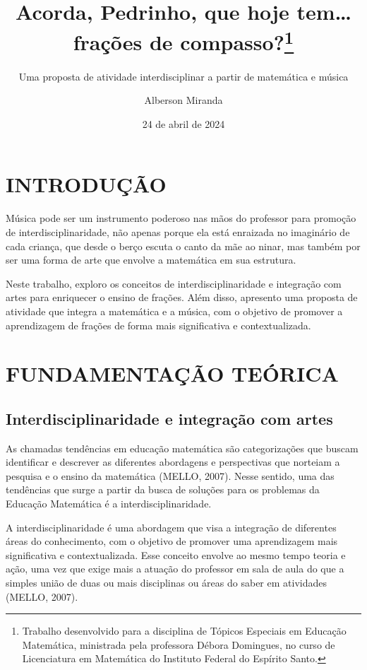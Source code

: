 \documentclass[
  letterpaper,
  DIV=11,
  numbers=noendperiod]{scrreprt}
\title{Acorda, Pedrinho, que hoje tem\ldots{} frações de
compasso?\thanks{Trabalho desenvolvido para a disciplina de Tópicos
Especiais em Educação Matemática, ministrada pela professora Débora
Domingues, no curso de Licenciatura em Matemática do Instituto Federal
do Espírito Santo.}}
\subtitle{Uma proposta de atividade interdisciplinar a partir de
matemática e música}
\author{Alberson Miranda}
\date{24 de abril de 2024}
\renewcommand*\contentsname{Índice}
\newcommand\contentsname{Índice}
\begin{document}
\maketitle

\renewcommand*\contentsname{Índice}
{
\hypersetup{linkcolor=}
\setcounter{tocdepth}{2}
\tableofcontents
}
\chapter{INTRODUÇÃO}\label{introduuxe7uxe3o}

Música pode ser um instrumento poderoso nas mãos do professor para
promoção de interdisciplinaridade, não apenas porque ela está enraizada
no imaginário de cada criança, que desde o berço escuta o canto da mãe
ao ninar, mas também por ser uma forma de arte que envolve a matemática
em sua estrutura.

Neste trabalho, exploro os conceitos de interdisciplinaridade e
integração com artes para enriquecer o ensino de frações. Além disso,
apresento uma proposta de atividade que integra a matemática e a música,
com o objetivo de promover a aprendizagem de frações de forma mais
significativa e contextualizada.

\chapter{FUNDAMENTAÇÃO TEÓRICA}\label{fundamentauxe7uxe3o-teuxf3rica}

\section{Interdisciplinaridade e integração com
artes}\label{interdisciplinaridade-e-integrauxe7uxe3o-com-artes}

As chamadas tendências em educação matemática são categorizações que
buscam identificar e descrever as diferentes abordagens e perspectivas
que norteiam a pesquisa e o ensino da matemática (MELLO, 2007). Nesse
sentido, uma das tendências que surge a partir da busca de soluções para
os problemas da Educação Matemática é a interdisciplinaridade.

A interdisciplinaridade é uma abordagem que visa a integração de
diferentes áreas do conhecimento, com o objetivo de promover uma
aprendizagem mais significativa e contextualizada. Esse conceito envolve
ao mesmo tempo teoria e ação, uma vez que exige mais a atuação do
professor em sala de aula do que a simples união de duas ou mais
disciplinas ou áreas do saber em atividades (MELLO, 2007).
\end{document}
